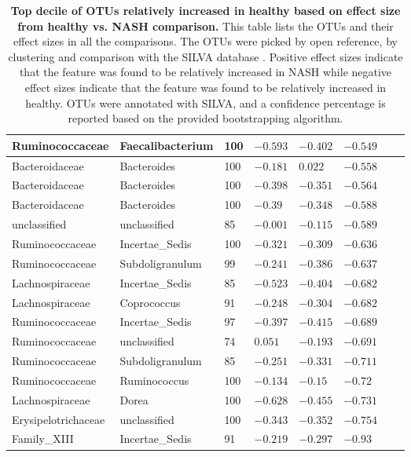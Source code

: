 \begin{table}[!ht]
\begin{tiny}
\begin{tabular}{|l|l|l|l|l|l|l|l|}
Ruminococcaceae & Faecalibacterium & 100 & $-0.593$ & $-0.402$ & $-0.549$ \\ \hline
Bacteroidaceae & Bacteroides & 100 & $-0.181$ & $0.022$ & $-0.558$ \\ \hline
Bacteroidaceae & Bacteroides & 100 & $-0.398$ & $-0.351$ & $-0.564$ \\ \hline
Bacteroidaceae & Bacteroides & 100 & $-0.39$ & $-0.348$ & $-0.588$ \\ \hline
unclassified & unclassified & 85 & $-0.001$ & $-0.115$ & $-0.589$ \\ \hline
Ruminococcaceae & Incertae_Sedis & 100 & $-0.321$ & $-0.309$ & $-0.636$ \\ \hline
Ruminococcaceae & Subdoligranulum & 99 & $-0.241$ & $-0.386$ & $-0.637$ \\ \hline
Lachnospiraceae & Incertae_Sedis & 85 & $-0.523$ & $-0.404$ & $-0.682$ \\ \hline
Lachnospiraceae & Coprococcus & 91 & $-0.248$ & $-0.304$ & $-0.682$ \\ \hline
Ruminococcaceae & Incertae_Sedis & 97 & $-0.397$ & $-0.415$ & $-0.689$ \\ \hline
Ruminococcaceae & unclassified & 74 & $0.051$ & $-0.193$ & $-0.691$ \\ \hline
Ruminococcaceae & Subdoligranulum & 85 & $-0.251$ & $-0.331$ & $-0.711$ \\ \hline
Ruminococcaceae & Ruminococcus & 100 & $-0.134$ & $-0.15$ & $-0.72$ \\ \hline
Lachnospiraceae & Dorea & 100 & $-0.628$ & $-0.455$ & $-0.731$ \\ \hline
Erysipelotrichaceae & unclassified & 100 & $-0.343$ & $-0.352$ & $-0.754$ \\ \hline
Family_XIII & Incertae_Sedis & 91 & $-0.219$ & $-0.297$ & $-0.93$ \\ \hline
\end{tabular}
\end{tiny}
\caption[Top decile of OTUs relatively increased in healthy based on effect size from healthy vs. NASH comparison.]{ \textbf{Top decile of OTUs relatively increased in healthy based on effect size from healthy vs. NASH comparison.} This table lists the OTUs and their effect sizes in all the comparisons. The OTUs were picked by open reference, by clustering and comparison with the SILVA database \cite{quast2013silva}. Positive effect sizes indicate that the feature was found to be relatively increased in NASH while negative effect sizes indicate that the feature was found to be relatively increased in healthy. OTUs were annotated with SILVA, and a confidence percentage is reported based on the provided bootstrapping algorithm.}
\label{nafld_bot_otu_table}
\end{table}

